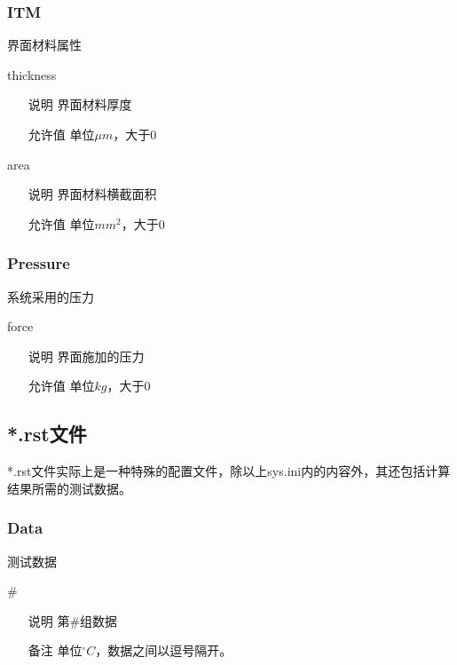 \subsubsection*{ITM}
界面材料属性
\begin{definition}{thickness}{}
    \begin{itemize}
        \item[说明] 界面材料厚度
        \item[允许值] 单位$\mu m$，大于0
    \end{itemize}
\end{definition}
\begin{definition}{area}{}
    \begin{itemize}
        \item[说明] 界面材料横截面积
        \item[允许值] 单位$mm^2$，大于0
    \end{itemize}
\end{definition}

\subsubsection*{Pressure}
系统采用的压力
\begin{definition}{force}{}
    \begin{itemize}
        \item[说明] 界面施加的压力
        \item[允许值] 单位$kg$，大于0
    \end{itemize}
\end{definition}

\subsection{*.rst文件}
*.rst文件实际上是一种特殊的配置文件，除以上sys.ini内的内容外，其还包括计算结果所需的测试数据。

\subsubsection*{Data}
测试数据
\begin{definition}{\#}{}
    \begin{itemize}
        \item[说明] 第\#组数据
        \item[备注] 单位$^{\circ}C$，数据之间以逗号隔开。
    \end{itemize}
\end{definition}